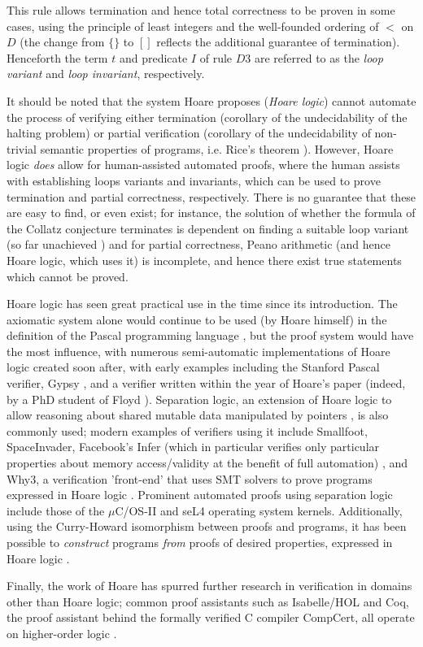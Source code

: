 \documentclass[11pt]{article}
\begin{document}
This rule allows termination and hence total correctness to be proven in some
cases, using the principle of least integers and the well-founded ordering of
$<$ on $D$ (the change from $\{\}$ to $[]$ reflects the additional
guarantee of termination). Henceforth the term $t$ and predicate
$I$ of rule $D3$ are referred to as the \textit{loop variant} and
\textit{loop invariant}, respectively.
\par
It should be noted that the system Hoare proposes (\textit{Hoare logic}) cannot
automate the process of verifying either termination (corollary of the
undecidability of the halting problem) or partial verification (corollary of the
undecidability of non-trivial semantic properties of programs, i.e. Rice's
theorem \cite{rice1953classes}). However, Hoare logic \textit{does} allow for
human-assisted automated proofs, where the human assists with establishing loops
variants and invariants, which can be used to prove termination and partial
correctness, respectively. There is no guarantee that these are easy to find, or
even exist; for instance, the solution of whether the formula of the Collatz
conjecture terminates is dependent on finding a suitable loop variant (so far
unachieved \cite{andrei1998collatz}) and for partial correctness, Peano
arithmetic (and hence Hoare logic, which uses it) is incomplete, and hence there
exist true statements which cannot be proved.
\par
Hoare logic has seen great practical use in the time since its introduction. The
axiomatic system alone would continue to be used (by Hoare himself) in the
definition of the Pascal programming language \cite{hoare1973axiomatic}, but the
proof system would have the most influence, with numerous semi-automatic
implementations of Hoare logic created soon after, with early examples including
the Stanford Pascal verifier, Gypsy \cite{brocard2013programming}, and a
verifier written within the year of Hoare's paper (indeed, by a PhD student of
Floyd \cite{king1969program}). Separation logic, an extension of Hoare logic
to allow reasoning about shared mutable data manipulated by pointers
\cite{reynolds2002separation}, is also commonly used; modern examples of
verifiers using it include Smallfoot, SpaceInvader, Facebook's Infer (which in
particular verifies only particular properties about memory access/validity at
the benefit of full automation) \cite{fbresearch}, and Why3, a verification
'front-end' that uses SMT solvers to prove programs expressed in Hoare logic
\cite{filliatre2013why3}.  Prominent automated proofs using separation logic
include those of the $\mu$C/OS-II \cite{xu2016practical} and seL4
\cite{seL4_2019} operating system kernels.  Additionally, using the Curry-Howard
isomorphism between proofs and programs, it has been possible to
\textit{construct} programs \textit{from} proofs of desired properties,
expressed in Hoare logic \cite{poernomo2003curry}.
\par
Finally, the work of Hoare has spurred further research in verification in
domains other than Hoare logic; common proof assistants such as Isabelle/HOL and
Coq, the proof assistant behind the formally verified C compiler CompCert, all
operate on higher-order logic \cite{myreen2012proof}.
\end{document}
